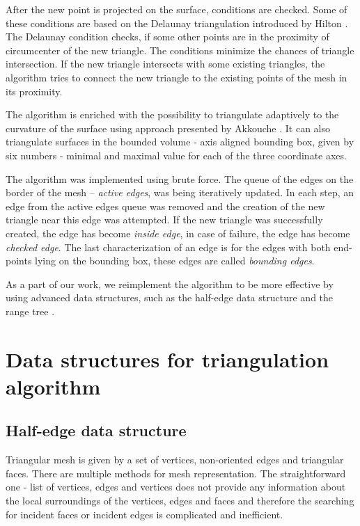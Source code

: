After the new point is projected on the surface, conditions are checked. 
Some of these conditions are based on the Delaunay triangulation introduced
by Hilton \cite{hilton1996marching}. The Delaunay condition checks,
if some other points are in the proximity of circumcenter of the new triangle.
The conditions minimize the chances of triangle intersection.
If the new triangle intersects with some existing triangles, the algorithm
tries to connect the new triangle to the existing points of the mesh in its proximity.

The algorithm is enriched with the possibility to triangulate adaptively
to the curvature of the surface using approach presented by Akkouche 
\cite{akkouche2001adaptive}. It can also triangulate surfaces in the
bounded volume - axis aligned bounding box, given by six numbers - minimal
and maximal value for each of the three coordinate axes.

The algorithm was implemented using brute force. The queue of the edges
on the border of the mesh -- \textit{active edges}, was being iteratively updated. 
In each step, an edge from the active edges queue was removed
and the creation of the new triangle near this edge was attempted.
If the new triangle was successfully created, the edge has become 
\textit{inside edge}, in case of failure, the edge has become 
\textit{checked edge}. The last characterization of an edge is for
the edges with both end-points lying on the bounding box, these edges
are called \textit{bounding edges}.

As a part of our work, we reimplement the algorithm to be more effective by
using advanced data structures, such as the half-edge data structure 
\cite{kettner1999using} and the range tree \cite{lueker1978data}.

\section{Data structures for triangulation algorithm}
\label{sub2.5}

\subsection{Half-edge data structure}
Triangular mesh is given by a set of vertices, non-oriented edges and triangular faces.
There are multiple methods for mesh representation. The straightforward one -
list of vertices, edges and vertices does not provide any information about
the local surroundings of the vertices, edges and faces and therefore the searching
for incident faces or incident edges is complicated and inefficient.

